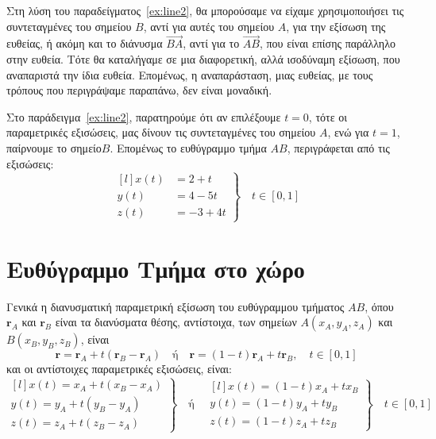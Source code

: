 \begin{rem}
  Στη λύση του παραδείγματος~\ref{ex:line2}, θα μπορούσαμε να είχαμε χρησιμοποιήσει 
  τις συντεταγμένες του σημείου $ B $, αντί για αυτές του σημείου $A$, για την εξίσωση 
  της ευθείας, ή ακόμη και το διάνυσμα $ \vec{BA} $, αντί για το $ \vec{AB} $, που 
  είναι επίσης παράλληλο στην ευθεία. Τότε θα καταλήγαμε σε μια διαφορετική, αλλά 
  ισοδύναμη εξίσωση, που αναπαριστά την ίδια ευθεία. Επομένως, η αναπαράσταση, μιας 
  ευθείας, με τους τρόπους που περιγράψαμε παραπάνω, δεν είναι μοναδική.
\end{rem}
\begin{rem}
  Στο παράδειγμα~\ref{ex:line2}, παρατηρούμε ότι αν επιλέξουμε $ t=0 $, τότε οι 
  παραμετρικές εξισώσεις, μας δίνουν τις συντεταγμένες του σημείου $ A $, ενώ για 
  $ t=1 $, παίρνουμε το σημείο$ B $. Επομένως το ευθύγραμμο τμήμα $ AB $, 
  περιγράφεται από τις εξισώσεις:
  \[
    \left.
      \begin{matrix*}[l]
        x(t) &= 2+t \\
        y(t) &= 4-5t \\
        z(t) &= -3+4t
      \end{matrix*} 
    \right\} \quad  t \in [0,1]
  \]


  \section*{Ευθύγραμμο Τμήμα στο χώρο}

  Γενικά η διανυσματική παραμετρική εξίσωση του ευθύγραμμου τμήματος $ AB $, όπου
  $ \mathbf{r}_{A} $ και $ \mathbf{r}_{B} $ είναι τα διανύσματα θέσης, αντίστοιχα, των 
  σημείων $ A(x_{A},y_{A},z_{A}) $ και $B(x_{B},y_{B},z_{B})$, είναι 
  \[
    \boxed{\mathbf{r} = \mathbf{r}_{A} + t(\mathbf{r}_{B}- \mathbf{r}_{A})} 
    \quad \text{ή} \quad \boxed{\mathbf{r} = (1-t) \mathbf{r}_{A} + t \mathbf{r}_{B}}, 
    \quad t \in [0,1]
  \] 
  και οι αντίστοιχες παραμετρικές εξισώσεις, είναι:
  \[
    \boxed{\left.
        \begin{matrix*}[l]
          x(t) = x_{A} + t(x_{B}-x_{A}) \\
          y(t) = y_{A} + t(y_{B}-y_{A}) \\
          z(t) = z_{A} + t(z_{B}-z_{A}) 
        \end{matrix*} 
    \right\}} \quad \text{ή} \quad  
    \boxed{\left.
        \begin{matrix*}[l]
          x(t) = (1-t)x_{A} + tx_{B} \\
          y(t) = (1-t)y_{A} + ty_{B} \\
          z(t) = (1-t)z_{A} + tz_{B} 
        \end{matrix*} 
    \right\}} \quad t \in [0,1]
  \]
\end{rem}

